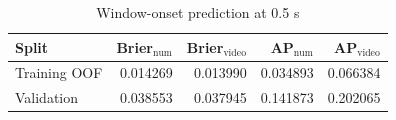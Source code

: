 \begin{table}[htbp]
\centering
\small
\caption{Window-onset prediction at 0.5 s}
\label{tab:onset}
\setlength{\tabcolsep}{4pt}
\begin{tabular}{lrrrr}
\toprule
Split & Brier$_{\mathrm{num}}$ & Brier$_{\mathrm{video}}$ & AP$_{\mathrm{num}}$ & AP$_{\mathrm{video}}$\\
\midrule
Training OOF & 0.014269 & 0.013990 & 0.034893 & 0.066384\\
Validation & 0.038553 & 0.037945 & 0.141873 & 0.202065\\
\bottomrule
\end{tabular}
\end{table}

